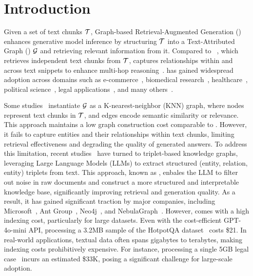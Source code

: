 \section{Introduction}
Given a set of text chunks $\mathcal{T}$, Graph-based Retrieval-Augmented Generation (\graphrag)~\cite{nebularag,edge2024local} enhances generative model inference by structuring $\mathcal{T}$ into a Text-Attributed Graph (\textgraph{}) $\mathcal{G}$ and retrieving relevant information from it.
Compared to \textrag~\cite{lewis2020retrieval}, which retrieves independent text chunks from $\mathcal{T}$, \graphrag captures relationships within and across text snippets to enhance multi-hop reasoning~\cite{peng2024graph,delile2024graph,jin2024graph}. \graphrag has gained widespread adoption across domains such as e-commerce~\cite{wang2022rete,xu2024retrieval}, biomedical research~\cite{delile2024graph,li2024dalk}, healthcare~\cite{chen24rarebench}, political science~\cite{mou2024unifying}, legal applications~\cite{colombo2024leveraging,kalra2024hypa}, and many others~\cite{alhanahnah2024depesrag,peng2024connecting}.

Some studies~\cite{li2024graph,wang2024knowledge} instantiate \textgraph{} $\mathcal{G}$ as a K-nearest-neighbor (KNN) graph, where nodes represent text chunks in $\mathcal{T}$, and edges encode semantic similarity or relevance. This approach maintains a low graph construction cost comparable to \textrag. However, it fails to capture entities and their relationships within text chunks, limiting retrieval effectiveness and degrading the quality of generated answers. 
To address this limitation, recent studies~\cite{li2024dalk,delile2024graph,edge2024local,gutierrez2024hipporag} have turned to triplet-based knowledge graphs, leveraging Large Language Models (LLMs) to extract structured (entity, relation, entity) triplets from text. This approach, known as \kgrag, enbales the LLM to filter out noise in raw documents and construct a more structured and interpretable knowledge base, significantly improving retrieval and generation quality. As a result, it has gained significant traction by major companies, including Microsoft~\cite{edge2024local}, Ant Group~\cite{antgrouprag}, Neo4j~\cite{neo4jrag}, and NebulaGraph~\cite{nebularag}.
However, \kgrag comes with a high indexing cost, particularly for large datasets. Even with the cost-efficient GPT-4o-mini API, processing a 3.2MB sample of the HotpotQA dataset~\cite{yang2018hotpotqa} costs \$21. 
In real-world applications, textual data often spans gigabytes to terabytes, making indexing costs prohibitively expensive. For instance, processing a single 5GB legal case~\cite{arnold2022ediscovery} incurs an estimated \$33K, posing a significant challenge for large-scale adoption.

